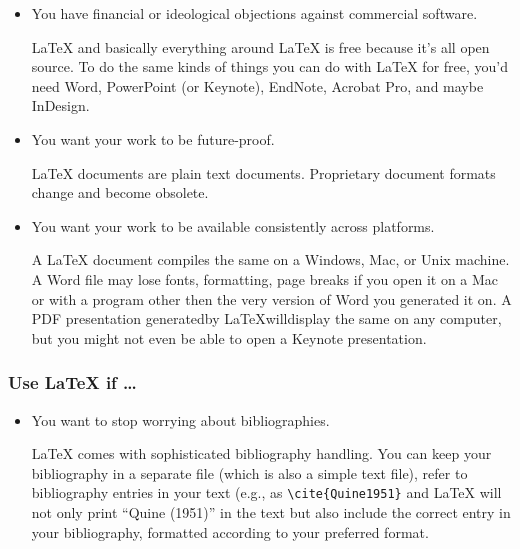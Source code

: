 \begin{frame}
\begin{frame}
\begin{itemize}
\item You have financial or ideological objections against commercial
  software.

\begin{articleonly}
\LaTeX{} and basically everything around \LaTeX{} is free because it's
all open source. To do the same kinds of things you can do with
\LaTeX{} for free, you'd need Word, PowerPoint (or Keynote), EndNote,
Acrobat Pro, and maybe InDesign.
\end{articleonly}

\item You want your work to be future-proof.

\begin{articleonly}
\LaTeX{} documents are plain text documents. Proprietary document
formats change and become obsolete.
\end{articleonly}

\item You want your work to be available consistently across platforms.

\begin{articleonly}
A \LaTeX{} document compiles the same on a Windows, Mac, or Unix
machine.  A Word file may lose fonts, formatting, page breaks if you
open it on a Mac or with a program other then the very version of Word
you generated it on.  A PDF presentation generatedby
\LaTeX{}willdisplay the same on any computer, but you might not even
be able to open a Keynote presentation.
\end{articleonly}
\end{itemize}

\end{frame}

\begin{frame}
\frametitle{Use \LaTeX{} if \dots}

\begin{itemize}
\item You want to stop worrying about bibliographies.

\begin{articleonly}
\LaTeX{} comes with sophisticated bibliography handling. You can keep
your bibliography in a separate \BibTeX{} file (which is also a simple
text file), refer to bibliography entries in your text (e.g., as
\verb+\cite{Quine1951}+ and \LaTeX{} will not only print ``Quine
(1951)'' in the text but also include the correct entry in your
bibliography, formatted according to your preferred format.
\end{articleonly}


\end{itemize}
\end{frame}
\end{frame}
